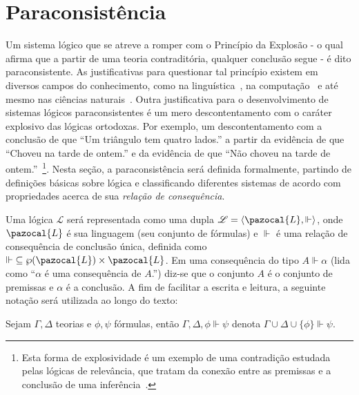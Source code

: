 \section{Paraconsistência}
\label{sec:paracons}
    Um sistema lógico que se atreve   a romper com o Princípio da Explosão {-} o qual afirma que a partir de uma teoria contraditória, qualquer conclusão segue {-} é dito paraconsistente. As justificativas para questionar tal princípio existem em diversos campos do conhecimento, como na linguística~\cite{McGinnis2013-MCGTUA}, na computação~\cite{carnielli2000formal} e até mesmo nas ciências naturais~\cite{Brown2015-BROCAP-9}. Outra justificativa para o desenvolvimento de sistemas lógicos paraconsistentes é um mero descontentamento com o caráter explosivo das lógicas ortodoxas. Por exemplo, um descontentamento com a conclusão de que ``Um triângulo tem quatro lados.'' a partir da evidência de que ``Choveu na tarde de ontem.'' e da evidência de que ``Não choveu na tarde de ontem.''~\footnote{Esta forma de explosividade é um exemplo de uma contradição estudada pelas lógicas de relevância, que tratam da conexão entre as premissas e a conclusão de uma inferência~\cite{sep-logic-relevance}.}. Nesta seção, a paraconsistência será definida formalmente, partindo de definições básicas sobre lógica e classificando diferentes sistemas de acordo com propriedades acerca de sua \textit{relação de consequência}.

    Uma lógica $\mathcal{L}$ será representada como uma dupla $\mathcal{L} = \langle \pazocal{L},\Vdash \rangle$, onde $\pazocal{L}$ é sua linguagem (seu conjunto de fórmulas) e $\Vdash$ é uma relação de consequência de conclusão única, definida como $\Vdash \;\subseteq \wp(\pazocal{L})\times\pazocal{L}$. Em uma consequência do tipo $A \Vdash \alpha$ (lida como ``$\alpha$ é uma consequência de $A$.'') diz-se que o conjunto $A$ é o conjunto de premissas e $\alpha$ é a conclusão. A fim de facilitar a escrita e leitura, a seguinte notação será utilizada ao longo do texto:

    \begin{notacao}
        Sejam $\Gamma, \Delta$ teorias e $\phi, \psi$ fórmulas, então $\Gamma, \Delta, \phi \Vdash \psi$ denota $\Gamma \cup \Delta \cup \{\phi\} \Vdash \psi$.
    \end{notacao}


